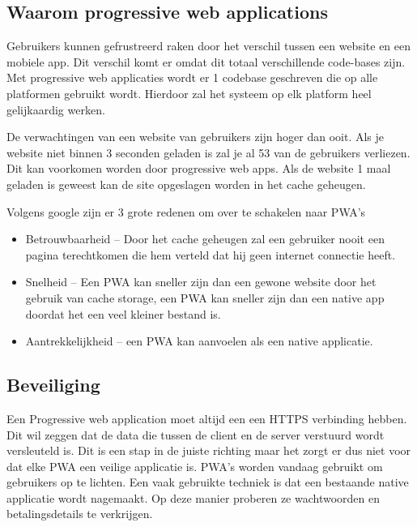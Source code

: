 \autocite{Malavolta2016}
\autocite{Destrebecq2018}

\subsection{Waarom progressive web applications}
Gebruikers kunnen gefrustreerd raken door het verschil tussen een website en een mobiele app. Dit verschil komt er omdat dit totaal verschillende code-bases zijn. Met progressive web applicaties wordt er 1 codebase geschreven die op alle platformen gebruikt wordt. Hierdoor zal het systeem op elk platform heel gelijkaardig werken.
\autocite{Google2019}

De verwachtingen van een website van gebruikers zijn hoger dan ooit. Als je website niet binnen 3 seconden geladen is zal je al 53%
van de gebruikers verliezen. Dit kan voorkomen worden door progressive web apps. Als de website 1 maal geladen is geweest kan de site opgeslagen worden in het cache geheugen. 
\autocite{Google2017}

Volgens google zijn er 3 grote redenen om over te schakelen naar PWA’s

\begin{itemize}
    \item Betrouwbaarheid – Door het cache geheugen zal een gebruiker nooit een pagina terechtkomen die hem verteld dat hij geen internet connectie heeft.
    \item Snelheid – Een PWA kan sneller zijn dan een gewone website door het gebruik van cache storage, een PWA kan sneller zijn dan een native app doordat het een veel kleiner bestand is.
    \item Aantrekkelijkheid – een PWA kan aanvoelen als een native applicatie.
\end{itemize}
\autocite{GooglePwa2019}

\subsection{Beveiliging}
Een Progressive web application moet altijd een een HTTPS verbinding hebben. Dit wil zeggen dat de data die tussen de client en de server verstuurd wordt versleuteld is.
\autocite{Durumeric2013}
Dit is een stap in de juiste richting maar het zorgt er dus niet voor dat elke PWA een veilige applicatie is. PWA’s worden vandaag gebruikt om gebruikers op te lichten. Een vaak gebruikte techniek is dat een bestaande native applicatie wordt nagemaakt. Op deze manier proberen ze wachtwoorden en betalingsdetails te verkrijgen.
\autocite{Lee2018}

